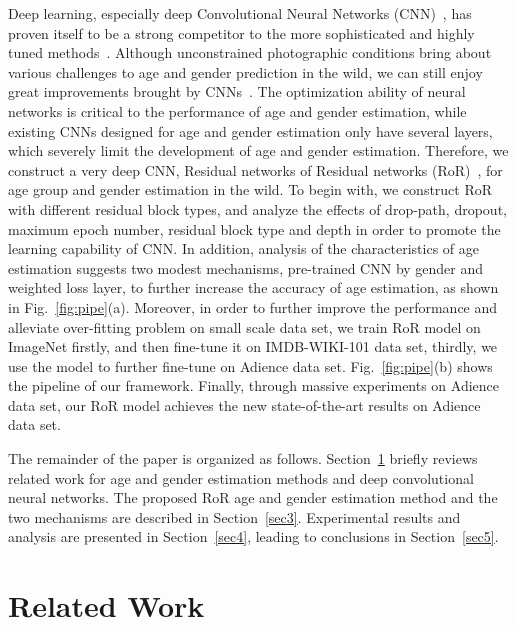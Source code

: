 \documentclass[journal]{IEEEtran}
\begin{document}
Deep learning, especially deep Convolutional Neural Networks (CNN)~\cite{Alex,Miao,NIN,Overfeat,simonyan2014vgg,romero2014fitnets,lee2015dsn,springgenberg2014allcnn,szegedy2015googlenet,ResNet}, has proven itself to be a strong competitor to the more sophisticated and highly tuned methods~\cite{offtheshelf}. 
Although unconstrained photographic conditions bring about various challenges to age and gender prediction in the wild, we can still enjoy great improvements brought by CNNs~\cite{Agemulti,AgeWang,Agegenderbycnn,AgeSAAF,Dex}. 
The optimization ability of neural networks is critical to the performance of age and gender estimation, while existing CNNs designed for age and gender estimation only have several layers, which severely limit the development of age and gender estimation. Therefore, we construct a very deep CNN, Residual networks of Residual networks (RoR)~\cite{Ror}, for age group and gender estimation in the wild. 
To begin with, we construct RoR with different residual block types, and analyze the effects of drop-path, dropout, maximum epoch number, residual block type and depth in order to promote the learning capability of CNN.
In addition, analysis of the characteristics of age estimation suggests two modest mechanisms, pre-trained CNN by gender and weighted loss layer, to further increase the accuracy of age estimation, as shown in Fig.~\ref{fig:pipe}(a).
Moreover, in order to further improve the performance and alleviate over-fitting problem on small scale data set, we train RoR model on ImageNet firstly, and then fine-tune it on IMDB-WIKI-101 data set, thirdly, we use the model to further fine-tune on Adience data set. Fig.~\ref{fig:pipe}(b) shows the pipeline of our framework.
Finally, through massive experiments on Adience data set, our RoR model achieves the new state-of-the-art results on Adience data set. \par
The remainder of the paper is organized as follows. Section~\ref{sec2} briefly reviews related work for age and gender estimation methods and deep convolutional neural networks. The proposed RoR age and gender estimation method and the two mechanisms are described in Section~\ref{sec3}. Experimental results and analysis are presented in Section~\ref{sec4}, leading to conclusions in Section~\ref{sec5}.

\section{Related Work}\label{sec2}
\end{document}
